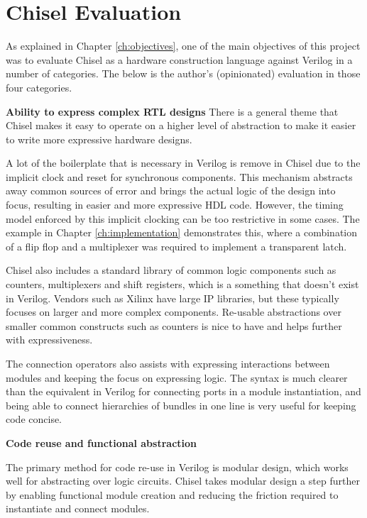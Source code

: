 \section{Chisel Evaluation}

As explained in Chapter \ref{ch:objectives}, one of the main objectives of this project was to evaluate Chisel as a hardware construction language against Verilog in a number of categories. The below is the author's (opinionated) evaluation in those four categories.

\textbf{Ability to express complex RTL designs}
There is a general theme that Chisel makes it easy to operate on a higher level of abstraction to make it easier to write more expressive hardware designs.

A lot of the boilerplate that is necessary in Verilog is remove in Chisel due to the implicit clock and reset for synchronous components. This mechanism abstracts away common sources of error and brings the actual logic of the design into focus, resulting in easier and more expressive HDL code. However, the timing model enforced by this implicit clocking can be too restrictive in some cases. The example in Chapter \ref{ch:implementation} demonstrates this, where a combination of a flip flop and a multiplexer was required to implement a transparent latch.

Chisel also includes a standard library of common logic components such as counters, multiplexers and shift registers, which is a something that doesn't exist in Verilog. Vendors such as Xilinx have large IP libraries, but these typically focuses on larger and more complex components. Re-usable abstractions over smaller common constructs such as counters is nice to have and helps further with expressiveness.

The connection operators also assists with expressing interactions between modules and keeping the focus on expressing logic. The syntax is much clearer than the equivalent in Verilog for connecting ports in a module instantiation, and being able to connect hierarchies of bundles in one line is very useful for keeping code concise.

\textbf{Code reuse and functional abstraction}

The primary method for code re-use in Verilog is modular design, which works well for abstracting over logic circuits. Chisel takes modular design a step further by enabling functional module creation and reducing the friction required to instantiate and connect modules.

